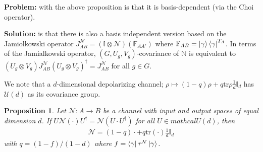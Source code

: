 \documentclass[10pt,oneside,longbibliography]{report}
\newtheorem{proposition}{Proposition}[section]
\begin{document}
\noindent \textbf{Problem:} with the above proposition is that it is basis-dependent (via the Choi operator). 

\noindent\textbf{Solution:} is that there is also a basis independent version based on the Jamiolkowski operator $J^{\mathcal{N}}_{AB} = (\mathbb{I}\otimes \mathcal{N})(\mathbb{F}_{AA'})$ where $\mathbb{F}_{AB} =\ket{\gamma}\bra{\gamma}^{T_A}$. In terms of the Jamialkowski operator, $(G,U_g,V_g)$-covariance of $\mathbb{N}$ is equivalent to $(U_g \otimes V_g) J^{\mathcal{N}}_{AB} (U_g \otimes V_g)^{\dagger} = J_{AB}^{\mathcal{N}}$ for all $g \in G$.

We note that a $d$-dimensional depolarizing channel; $\rho \mapsto (1-q)\rho + q \text{tr}\rho \frac{1}{d} \mathbb{I}_d$ has $\mathcal{U}(d)$ as its covariance group. 

\begin{proposition}
Let $\mathcal{N}: A\rightarrow B$ be a channel with input and output spaces of equal dimension $d$. If $U \mathcal{N}(\cdot) U^{\dagger}=\mathcal{N}(U \cdot U^{\dagger})$ for all $U\in mathcal{U}(d)$, then 
\begin{align}
    \mathcal{N}=(1-q) \cdot + q \text{tr}(\cdot) \frac{1}{d} \mathbb{I}_d
\end{align}
with $q=(1-f)/(1-d)$ where $f=\bra{\gamma}\tau^{\mathcal{N}}\ket{\gamma}$.
\end{proposition}
{}

\end{document}
